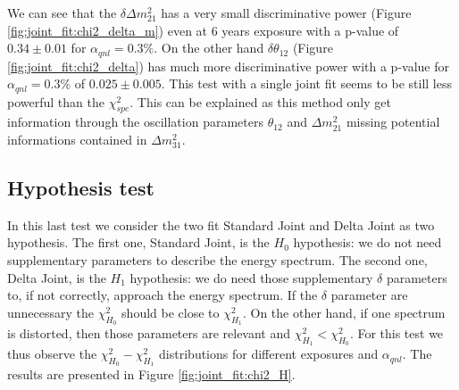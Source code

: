 \documentclass[../main.tex]{subfiles}
\begin{document}
We can see that the $\delta \Delta m^2_{21}$ has a very small discriminative power (Figure \ref{fig:joint_fit:chi2_delta_m}) even at 6 years exposure with a p-value of $0.34 \pm 0.01$ for $\alpha_{qnl} = 0.3\%$. On the other hand $\delta \theta_{12}$ (Figure \ref{fig:joint_fit:chi2_delta}) has much more discriminative power with a p-value for $\alpha_{qnl} = 0.3\%$ of $0.025 \pm 0.005$. This test with a single joint fit seems to be still less powerful than the $\chi^2_{spe}$. This can be explained as this method only get information through the oscillation parameters $\theta_{12}$ and $\Delta m^2_{21}$ missing potential informations contained in $\Delta m^2_{31}$.

\subsection{Hypothesis test}

In this last test we consider the two fit Standard Joint and Delta Joint as two hypothesis. The first one, Standard Joint, is the $H_0$ hypothesis: we do not need supplementary parameters to describe the energy spectrum. The second one, Delta Joint, is the $H_1$ hypothesis: we do need those supplementary $\delta$ parameters to, if not correctly, approach the energy spectrum. If the $\delta$ parameter are unnecessary the $\chi^2_{H_0}$ should be close to $\chi^2_{H_1}$. On the other hand, if one spectrum is distorted, then those parameters are relevant and $\chi^2_{H_1} < \chi^2_{H_0}$. For this test we thus observe the $\chi^2_{H_0} - \chi^2_{H_1}$ distributions for different exposures and $\alpha_{qnl}$. The results are presented in Figure \ref{fig:joint_fit:chi2_H}.
\end{document}
